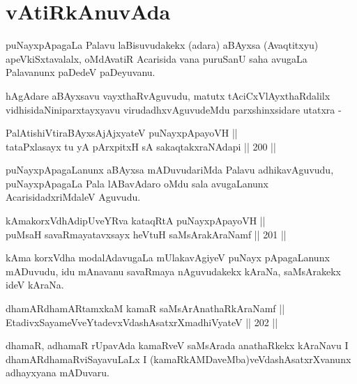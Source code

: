 \section*{vAtiRkAnuvAda}

\begin{artha}
puNayxpApagaLa Palavu laBisuvudakekx (adara) aBAyxsa (Avaqtitxyu)
apeVkiSxtavalalx, oMdAvatiR Acarisida vana puruSanU saha avugaLa
Palavanunx paDedeV paDeyuvanu.
\end{artha}

\begin{artha}
hAgAdare aBAyxsavu vayxthaRvAguvudu, matutx tAciCxVlAyxthaRdalilx
vidhisidaNiniparxtayxyavu virudadhxvAguvudeMdu parxshinxsidare utatxra -
\end{artha}

\begin{shl}
PalAtishiVtiraBAyxsAjAjxyateV puNayxpApayoVH || \\
tataPxlasayx tu yA pArxpitxH sA sakaqtakxraNAdapi \hfill || 200 ||  
\end{shl}

\begin{artha}
puNayxpApagaLanunx aBAyxsa mADuvudariMda Palavu adhikavAguvudu,
puNayxpApagaLa Pala lABavAdaro oMdu sala avugaLanunx
AcarisidadxriMdaleV Aguvudu.
\end{artha}


\begin{shl}
kAmakorxVdhAdipUveYRva kataqRtA puNayxpApayoVH || \\
puMsaH savaRmayatavxsayx heVtuH saMsArakAraNamf \hfill || 201 ||  
\end{shl}

\begin{artha}
kAma korxVdha modalAdavugaLa mUlakavAgiyeV puNayx pApagaLanunx
mADuvudu, idu mAnavanu savaRmaya nAguvudakekx kAraNa, saMsArakekx ideV
kAraNa.
\end{artha}


\begin{shl}
dhamARdhamARtamxkaM kamaR saMsArAnathaRkAraNamf || \\
EtadivxSayameVveYtadevxVdashAsatxrXmadhiVyateV \hfill || 202 ||  
\end{shl}

\begin{artha}
dhamaR, adhamaR rUpavAda kamaRveV saMsArada anathaRkekx kAraNavu I
dhamARdhamaRviSayavuLaLx I (kamaRkAMDaveMba)veVdashAsatxrXvanunx
adhayxyana mADuvaru.
\end{artha}

